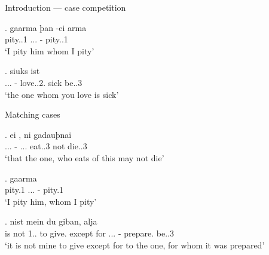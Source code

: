 \documentclass[xcolor=dvipsnames,10pt]{beamer}
\begin{document}
\begin{frame}{Introduction --- case competition}

\exg. gaarma þan -ei arma\\
 pity..1\scsub{[acc]} ... - pity..1\scsub{[acc]}\\
 `I pity him whom I pity' \label{ex:gothic-acc-acc}

\pause

\exg.    siuks ist\\
 ... - love..2.\scsub{[acc]} sick be..3\scsub{[nom]}\\
 `the one whom you love is sick' \label{ex:gothic-acc-nom}

\end{frame}




\begin{frame}{Matching cases}

\exg. ei    , ni gadauþnai\\
 ... - ... eat..3\scsub{[nom]} not die..3\scsub{[nom]}\\
`that the one, who eats of this may not die' \label{ex:gothic-nom-nom}

\pause

\exg. gaarma   \\
 pity.1\scsub{[acc]} ... - pity.1\scsub{[acc]}\\
 `I pity him, whom I pity' \label{ex:gothic-acc-acc-rep}

\pause

\exg. nist mein du giban, alja    \\
{is not} 1.. to give.\scsub{[dat]} {except for} ... - prepare. be..3\scsub{[dat]}\\
`it is not mine to give except for to the one, for whom it was prepared'\label{ex:gothic-dat-dat}

\end{frame}
\end{document}
